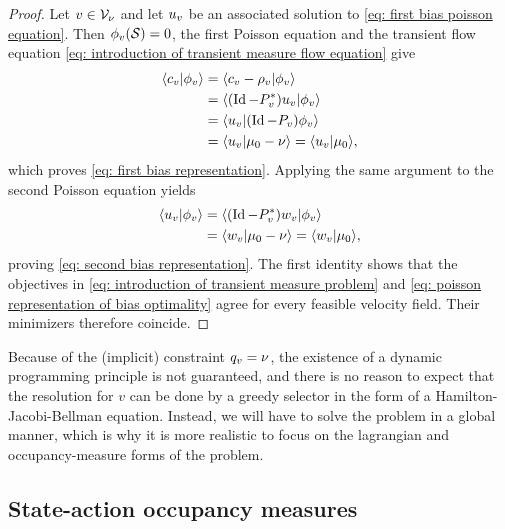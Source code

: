 \documentclass[twoside,10pt]{../jmlr}
\begin{document}
\begin{proof}
    Let $v\in\mathcal{V}_\nu$ and let $u_v$ be an associated solution to \eqref{eq: first bias poisson equation}. Then $\phi_v(\mathcal{S})=0$, the first Poisson equation and the transient flow equation \eqref{eq: introduction of transient measure flow equation} give
    \begin{align}
        \langle c_v\vert\phi_v\rangle
        &=\langle c_v-\rho_v\vert\phi_v\rangle\\
        &=\langle (\operatorname{Id}-P_v^*)u_v\vert\phi_v\rangle\\
        &=\langle u_v\vert(\operatorname{Id}-P_v)\phi_v\rangle\\
        &=\langle u_v\vert\mu_0-\nu\rangle
        =\langle u_v\vert\mu_0\rangle,
    \end{align}
    which proves \eqref{eq: first bias representation}. Applying the same argument to the second Poisson equation yields
    \begin{align}
        \langle u_v\vert\phi_v\rangle
        &=\langle (\operatorname{Id}-P_v^*)w_v\vert\phi_v\rangle\\
        &=\langle w_v\vert\mu_0-\nu\rangle
        =\langle w_v\vert\mu_0\rangle,
    \end{align}
    proving \eqref{eq: second bias representation}. The first identity shows that the objectives in \eqref{eq: introduction of transient measure problem} and \eqref{eq: poisson representation of bias optimality} agree for every feasible velocity field. Their minimizers therefore coincide.
\end{proof}

Because of the (implicit) constraint $q_v=\nu$, the existence of a dynamic programming principle is not guaranteed, and there is no reason to expect that the resolution for $v$ can be done by a greedy selector in the form of a Hamilton-Jacobi-Bellman equation. Instead, we will have to solve the problem in a global manner, which is why it is more realistic to focus on the lagrangian and occupancy-measure forms of the problem. 



\subsection{State-action occupancy measures}
\end{document}
